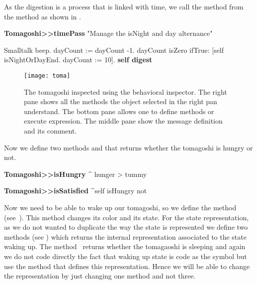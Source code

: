 As the digestion is a process that is linked with time, we call the method  from the method  as shown in .

\begin{method}\label{mth:timePassThree}
\textbf{Tomagoshi>>timePass}
   "Manage the isNight and day alternance"

   Smalltalk beep. 
   dayCount := dayCount -1.
   dayCount isZero
      ifTrue:
         [self isNightOrDayEnd. 
         dayCount := 10].
   \textbf{self digest}
\end{method}


\begin{figure}
\begin{center}
\texttt{[image: toma]}
\caption{The tomagoshi inspected using the behavioral inspector. The right pane shows all the methods the object selected in the right pan understand. The bottom pane allows one to define methods or execute expression. The middle pane show the message definition and its comment. \label{fig:toma}}
\end{center}
\end{figure}

Now we define two methods  and  that returns whether the tomagoshi is hungry or not. 

\begin{method}\label{mth:isHungry}
\textbf{Tomagoshi>>isHungry}
   ^ hunger > tummy 
\end{method}

\begin{method}\label{mth:isSatisfied}
\textbf{Tomagoshi>>isSatisfied}
   ^self isHungry not
\end{method}

Now we need to be able to wake up our tomagoshi, so we define the method  (see~). This method changes its color and its state. For the state representation, as we do not wanted to duplicate the way the state is represented we define two methods  (see ) which returns the internal representation associated to the state waking up. The method~ returns whether the tomagaoshi is sleeping and again we do not code directly the fact that waking up state is code as the symbol  but use the method  that defines this representation. Hence we will be able to change the representation by just changing one method and not three. 

